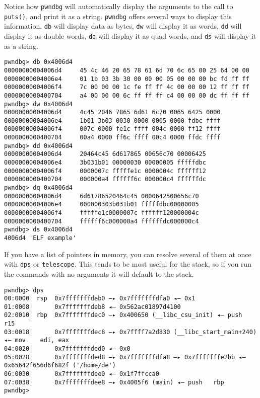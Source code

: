 \documentclass{article}
\begin{document}
Notice how \texttt{pwndbg} will automatically display the arguments to the call
to \texttt{puts()}, and print it as a string. \texttt{pwndbg} offers several
ways to display this information. \texttt{db} will display data as bytes,
\texttt{dw} will display it as words, \texttt{dd} will display it as double
words, \texttt{dq} will display it as quad words, and \texttt{ds} will display
it as a string.

\begin{lstlisting}
pwndbg> db 0x4006d4
00000000004006d4     45 4c 46 20 65 78 61 6d 70 6c 65 00 25 64 00 00
00000000004006e4     01 1b 03 3b 30 00 00 00 05 00 00 00 bc fd ff ff
00000000004006f4     7c 00 00 00 1c fe ff ff 4c 00 00 00 12 ff ff ff
0000000000400704     a4 00 00 00 6c ff ff ff c4 00 00 00 dc ff ff ff
pwndbg> dw 0x4006d4
00000000004006d4     4c45 2046 7865 6d61 6c70 0065 6425 0000
00000000004006e4     1b01 3b03 0030 0000 0005 0000 fdbc ffff
00000000004006f4     007c 0000 fe1c ffff 004c 0000 ff12 ffff
0000000000400704     00a4 0000 ff6c ffff 00c4 0000 ffdc ffff
pwndbg> dd 0x4006d4
00000000004006d4     20464c45 6d617865 00656c70 00006425
00000000004006e4     3b031b01 00000030 00000005 fffffdbc
00000000004006f4     0000007c fffffe1c 0000004c ffffff12
0000000000400704     000000a4 ffffff6c 000000c4 ffffffdc
pwndbg> dq 0x4006d4
00000000004006d4     6d61786520464c45 0000642500656c70
00000000004006e4     000000303b031b01 fffffdbc00000005
00000000004006f4     fffffe1c0000007c ffffff120000004c
0000000000400704     ffffff6c000000a4 ffffffdc000000c4
pwndbg> ds 0x4006d4
4006d4 'ELF example'
\end{lstlisting}

If you have a list of pointers in memory, you can resolve several of them at
once with \texttt{dps} or \texttt{telescope}. This tends to be most useful for
the stack, so if you run the commands with no arguments it will default to the
stack.

\begin{lstlisting}
pwndbg> dps
00:0000│ rsp  0x7fffffffdeb0 —▸ 0x7fffffffdfa0 ◂— 0x1
01:0008│      0x7fffffffdeb8 ◂— 0x562ac01897d4100
02:0010│ rbp  0x7fffffffdec0 —▸ 0x400650 (__libc_csu_init) ◂— push   r15
03:0018│      0x7fffffffdec8 —▸ 0x7ffff7a2d830 (__libc_start_main+240) ◂— mov    edi, eax
04:0020│      0x7fffffffded0 ◂— 0x0
05:0028│      0x7fffffffded8 —▸ 0x7fffffffdfa8 —▸ 0x7fffffffe2bb ◂— 0x65642f656d6f682f ('/home/de')
06:0030│      0x7fffffffdee0 ◂— 0x1f7ffcca0
07:0038│      0x7fffffffdee8 —▸ 0x4005f6 (main) ◂— push   rbp
pwndbg> 
\end{lstlisting}
\end{document}
